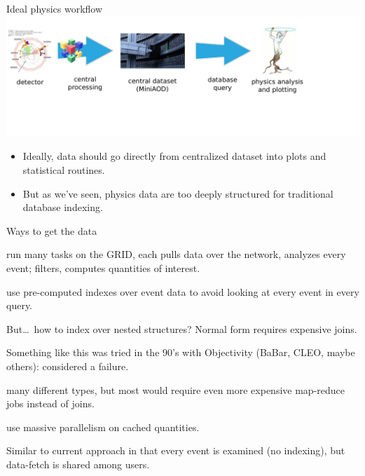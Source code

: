 \documentclass{beamer}
\begin{document}
\begin{frame}{Ideal physics workflow}
\vspace{0.5 cm}
\includegraphics[width=\linewidth]{workflow3.pdf}

\vspace{0.25 cm}
\begin{itemize}
\item Ideally, data should go directly from centralized dataset into plots and statistical routines.
\item<2-> But as we've seen, physics data are too deeply structured for traditional database indexing.
\end{itemize}

\vspace{1 cm}
\end{frame}

\begin{frame}{Ways to get the data}
\vspace{0.25 cm}
\small
\begin{description}\setlength{\itemsep}{0.2 cm}
\item[Parallel scripts (current):] run many tasks on the GRID, each pulls data over the network, analyzes every event; filters, computes quantities of interest.

\item[Relational database:]<2-> use pre-computed indexes over event data to avoid looking at every event in every query.

\vspace{0.1 cm}
But\ldots\ how to index over nested structures? Normal form requires expensive joins.

\vspace{0.1 cm}
Something like this was tried in the 90's with Objectivity (BaBar, CLEO, maybe others): considered a failure.

\item[NoSQL databases:]<3-> many different types, but most would require even more expensive map-reduce jobs instead of joins.

\item[GPU database:]<4-> use massive parallelism on cached quantities.

\vspace{0.1 cm}
Similar to current approach in that every event is examined (no indexing), but data-fetch is shared among users.
\end{description}
\end{frame}
\end{document}
